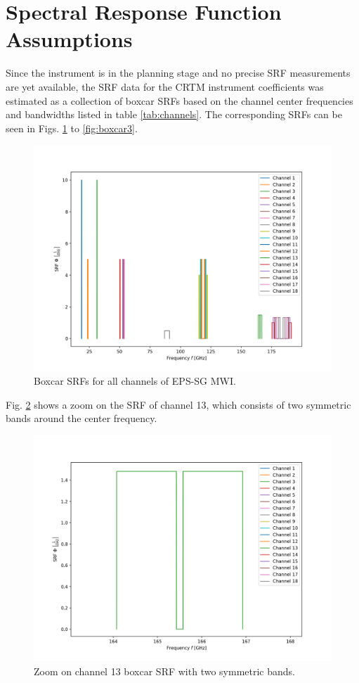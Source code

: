 \section{Spectral Response Function Assumptions}

Since the instrument is in the planning stage and no precise SRF measurements are yet available, the SRF data for the CRTM instrument coefficients was estimated as a collection of boxcar SRFs based on the channel center frequencies and bandwidths listed in table \ref{tab:channels}. 
The corresponding SRFs can be seen in Figs. \ref{fig:boxcar1} to \ref{fig:boxcar3}.

 \begin{figure}[H]
 \centering
 \includegraphics[width=\textwidth]{graphics/mwi-boxcar.png}
 \caption{Boxcar SRFs for all channels of EPS-SG MWI.}
 \label{fig:boxcar1}
 \end{figure}
 
 Fig. \ref{fig:boxcar2} shows a zoom on the SRF of channel 13, which consists of two symmetric bands around the center frequency.
 
  \begin{figure}[H]
 \centering
 \includegraphics[width=\textwidth]{graphics/mwi_boxcar_zoom_ch13.png}
 \caption{Zoom on channel 13 boxcar SRF with two symmetric bands.}
 \label{fig:boxcar2}
 \end{figure}
 
